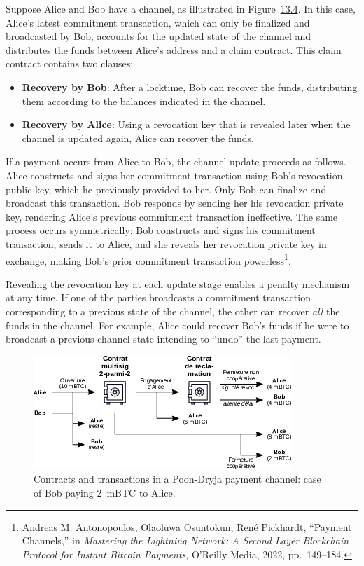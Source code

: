 \documentclass[
  a5paper,
  smalldemyvopaper,10pt,twoside,onecolumn,openright,extrafontsizes,hidelinks]{memoir}
\begin{document}
Suppose Alice and Bob have a channel, as illustrated in
Figure~\hyperref[fig:poon-dryja-contracts]{13.4}. In this case, Alice's
latest commitment transaction, which can only be finalized and
broadcasted by Bob, accounts for the updated state of the channel and
distributes the funds between Alice's address and a claim contract. This
claim contract contains two clauses:

\begin{itemize}
\item
  \textbf{Recovery by Bob}: After a locktime, Bob can recover the funds,
  distributing them according to the balances indicated in the channel.
\item
  \textbf{Recovery by Alice}: Using a revocation key that is revealed
  later when the channel is updated again, Alice can recover the funds.
\end{itemize}

If a payment occurs from Alice to Bob, the channel update proceeds as
follows. Alice constructs and signs her commitment transaction using
Bob's revocation public key, which he previously provided to her. Only
Bob can finalize and broadcast this transaction. Bob responds by sending
her his revocation private key, rendering Alice's previous commitment
transaction ineffective. The same process occurs symmetrically: Bob
constructs and signs his commitment transaction, sends it to Alice, and
she reveals her revocation private key in exchange, making Bob's prior
commitment transaction powerless\footnote{Andreas M. Antonopoulos,
  Olaoluwa Osuntokun, René Pickhardt, ``Payment Channels,'' in
  \emph{Mastering the Lightning Network: A Second Layer Blockchain
  Protocol for Instant Bitcoin Payments}, O'Reilly Media, 2022,
  pp.~149--184.}.

Revealing the revocation key at each update stage enables a penalty
mechanism at any time. If one of the parties broadcasts a commitment
transaction corresponding to a previous state of the channel, the other
can recover \emph{all} the funds in the channel. For example, Alice
could recover Bob's funds if he were to broadcast a previous channel
state intending to ``undo'' the last payment.

\begin{figure}

{\centering \includegraphics{chapters/img/lightning-poon-dryja-channel-contracts.png}

}

\caption{Contracts and transactions in a Poon-Dryja payment channel:
case of Bob paying 2~mBTC to Alice.}

\end{figure}%
\end{document}

